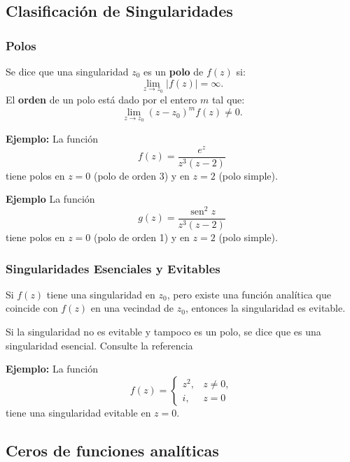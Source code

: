 \documentclass[a4paper,12pt]{article}
\begin{document}
\subsection{Clasificación de Singularidades}

\subsubsection{Polos}
Se dice que una singularidad $z_0$ es un \textbf{polo} de $f(z)$ si:
\begin{equation*}
    \lim_{z \to z_0} |f(z)| = \infty.
\end{equation*}
El \textbf{orden} de un polo está dado por el entero $m$ tal que:
\begin{equation*}
    \lim_{z \to z_0} (z - z_0)^m f(z) \neq 0.
\end{equation*}

\textbf{Ejemplo:} La función
\begin{equation*}
    f(z) = \frac{e^z}{z^3(z-2)}
\end{equation*}
tiene polos en $z=0$ (polo de orden 3) y en $z=2$ (polo simple).



\textbf{Ejemplo} La función
\begin{equation*}
    g(z)=\frac{\operatorname{sen}^{2} z}{z^{3}(z-2)}
\end{equation*}
tiene polos en $z=0$ (polo de orden 1) y en $z=2$ (polo simple).
\subsubsection{Singularidades Esenciales y Evitables}
Si $f(z)$ tiene una singularidad en $z_0$, pero existe una función analítica que coincide con $f(z)$ en una vecindad de $z_0$, entonces la singularidad es evitable.

Si la singularidad no es evitable y tampoco es un polo, se dice que es una 	singularidad esencial. Consulte la referencia \cite{Burckel1978}

\textbf{Ejemplo:} La función
\begin{equation*}
    f(z) = \begin{cases} z^2, & z \neq 0, \\ i, & z = 0 \end{cases}
\end{equation*}
tiene una singularidad evitable en $z=0$.

\subsection{Ceros de funciones analíticas}
\end{document}
